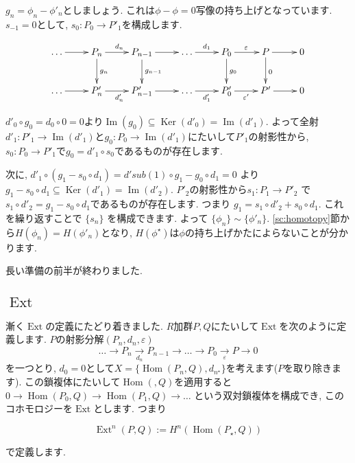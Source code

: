 \documentclass{jsarticle}
\newcommand{\makeop}[1]{\mathop{\mathrm{#1}}\nolimits}
\def\Im{\makeop{Im}}
\def\Ker{\makeop{Ker}}
\def\Hom{\makeop{Hom}}
\def\Ext{\makeop{Ext}}
\theoremstyle{definition}
\numberwithin{theorem}{section}
\begin{document}
$g_n = \phi_n - \phi'_n$としましょう. これは$\phi-\phi = 0$写像の持ち上げとなっています. $s_{-1} = 0$として,
$s_0: P_0 \rightarrow P'_1$を構成します.

\begin{equation*}
\xymatrix{
  \ldots \ar[r] & P_n \ar[r]^{d_n} \ar[d]^{g_n} & P_{n-1} \ar[r] \ar[d]^{g_{n-1}} & \ldots \ar[r]^{d_1} & P_0 \ar[r]^{\varepsilon} \ar[d]^{g_0} & P \ar[r] \ar[d]^{0} & 0 \\
  \ldots \ar[r] & P'_n \ar[r]_{d'_n} & P'_{n-1} \ar[r]& \ldots \ar[r]_{d'_1}& P'_0 \ar[r]_{\varepsilon'} & P' \ar[r]& 0
}
\end{equation*}

$d'_0\circ g_0 = d_0\circ 0 = 0$より$\Im(g_0) \subseteq \Ker(d'_0) = \Im(d'_1)$. よって全射
$d'_1: P'_1 \rightarrow \Im(d'_1)$と$g_0: P_0 \rightarrow \Im(d'_1)$にたいして$P'_1$の射影性から,
$s_0: P_0 \rightarrow P'_1$で$g_0 = d'_1 \circ s_0$であるものが存在します.

次に, $d'_1\circ(g_1 - s_0\circ d_1) = d'sub(1)\circ g_1 - g_0 \circ d_1 = 0$ より
$g_1 - s_0 \circ d_1 \subseteq \Ker(d'_1) = \Im(d'_2)$.
$P'_2$の射影性から$s_1: P_1 \rightarrow P'_2$ で $s_1\circ d'_2 = g_1 - s_0\circ d_1$であるものが存在します. つまり
$g_1 = s_1\circ d'_2 + s_0\circ d_1$. これを繰り返すことで $\{s_n\}$ を構成できます. よって $\{\phi_n\} \sim \{\phi'_n\}$.
\ref{sc:homotopy}節から$H(\phi_n) = H(\phi'_n)$となり, $H(\phi^\star)$は$\phi$の持ち上げかたによらないことが分かります.

長い準備の前半が終わりました.

\subsection{$\Ext$}
漸く$\Ext$の定義にたどり着きました.
$R$加群$P, Q$にたいして$\Ext$を次のように定義します. $P$の射影分解$(P_n, d_n, \varepsilon)$
\[
\ldots \rightarrow P_n \xrightarrow[d_n]{} P_{n-1} \rightarrow \ldots \rightarrow P_0 \xrightarrow[\varepsilon]{} P \rightarrow 0
\]
を一つとり, $d_0 = 0$として$X = \{\Hom(P_n, Q), d_{n^\star}\}$を考えます($P$を取り除きます).
この鎖複体にたいして$\Hom(, Q)$を適用すると$0\rightarrow \Hom(P_0, Q) \rightarrow \Hom(P_1, Q) \rightarrow \ldots$
という双対鎖複体を構成でき, このコホモロジーを$\Ext$とします. つまり

\begin{equation*}
\Ext^n(P, Q) := H^n(\Hom(P_\star, Q))
\end{equation*}

で定義します.
\end{document}
